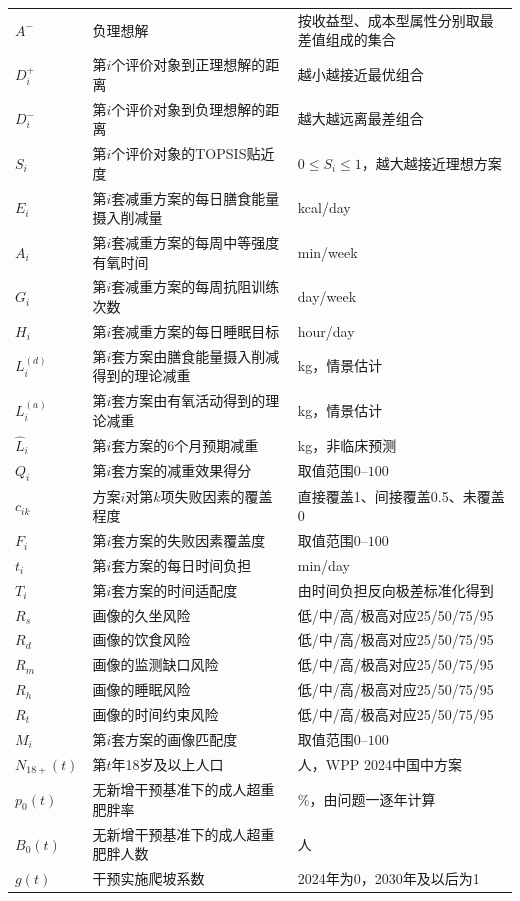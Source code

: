 \begin{longtable}{p{1.6cm}p{4.0cm}p{6.5cm}}
$A^-$ & 负理想解 & 按收益型、成本型属性分别取最差值组成的集合 \\
$D_i^+$ & 第$i$个评价对象到正理想解的距离 & 越小越接近最优组合 \\
$D_i^-$ & 第$i$个评价对象到负理想解的距离 & 越大越远离最差组合 \\
$S_i$ & 第$i$个评价对象的TOPSIS贴近度 & $0\leq S_i\leq1$，越大越接近理想方案 \\
\midrule
$E_i$ & 第$i$套减重方案的每日膳食能量摄入削减量 & kcal/day \\
$A_i$ & 第$i$套减重方案的每周中等强度有氧时间 & min/week \\
$G_i$ & 第$i$套减重方案的每周抗阻训练次数 & day/week \\
$H_i$ & 第$i$套减重方案的每日睡眠目标 & hour/day \\
$L_i^{(d)}$ & 第$i$套方案由膳食能量摄入削减得到的理论减重 & kg，情景估计 \\
$L_i^{(a)}$ & 第$i$套方案由有氧活动得到的理论减重 & kg，情景估计 \\
$\widehat L_i$ & 第$i$套方案的6个月预期减重 & kg，非临床预测 \\
$Q_i$ & 第$i$套方案的减重效果得分 & 取值范围$0$--$100$ \\
$c_{ik}$ & 方案$i$对第$k$项失败因素的覆盖程度 & 直接覆盖1、间接覆盖0.5、未覆盖0 \\
$F_i$ & 第$i$套方案的失败因素覆盖度 & 取值范围$0$--$100$ \\
$t_i$ & 第$i$套方案的每日时间负担 & min/day \\
$T_i$ & 第$i$套方案的时间适配度 & 由时间负担反向极差标准化得到 \\
$R_s$ & 画像的久坐风险 & 低/中/高/极高对应25/50/75/95 \\
$R_d$ & 画像的饮食风险 & 低/中/高/极高对应25/50/75/95 \\
$R_m$ & 画像的监测缺口风险 & 低/中/高/极高对应25/50/75/95 \\
$R_h$ & 画像的睡眠风险 & 低/中/高/极高对应25/50/75/95 \\
$R_t$ & 画像的时间约束风险 & 低/中/高/极高对应25/50/75/95 \\
$M_i$ & 第$i$套方案的画像匹配度 & 取值范围$0$--$100$ \\
\midrule
$N_{18+}(t)$ & 第$t$年18岁及以上人口 & 人，WPP 2024中国中方案 \\
$p_0(t)$ & 无新增干预基准下的成人超重肥胖率 & \%，由问题一逐年计算 \\
$B_0(t)$ & 无新增干预基准下的成人超重肥胖人数 & 人 \\
$g(t)$ & 干预实施爬坡系数 & 2024年为0，2030年及以后为1 \\

\end{longtable}
